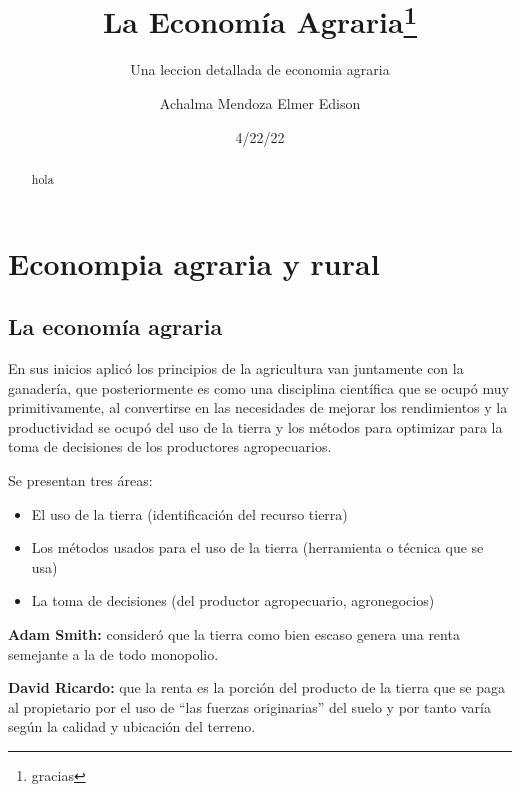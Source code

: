 \documentclass[
  a4paper,
]{article}
\title{La Economía Agraria\thanks{gracias}}
\subtitle{Una leccion detallada de economia agraria}
\author{Achalma Mendoza Elmer Edison}
\date{4/22/22}
\renewcommand*\contentsname{Table of contents}
\newcommand\contentsname{Table of contents}
\begin{document}
\maketitle
\begin{abstract}
hola
\end{abstract}
\ifdefined\Shaded\renewenvironment{Shaded}{\begin{tcolorbox}[frame hidden, enhanced, sharp corners, borderline west={3pt}{0pt}{shadecolor}, boxrule=0pt, breakable, interior hidden]}{\end{tcolorbox}}\fi

\renewcommand*\contentsname{Contenidos}
{
\hypersetup{linkcolor=}
\setcounter{tocdepth}{3}
\tableofcontents
}
\listoffigures
\listoftables
\hypertarget{econompia-agraria-y-rural}{%
\section{Econompia agraria y rural}\label{econompia-agraria-y-rural}}

\hypertarget{la-economuxeda-agraria}{%
\subsection{La economía agraria}\label{la-economuxeda-agraria}}

En sus inicios aplicó los principios de la agricultura van juntamente
con la ganadería, que posteriormente es como una disciplina científica
que se ocupó muy primitivamente, al convertirse en las necesidades de
mejorar los rendimientos y la productividad se ocupó del uso de la
tierra y los métodos para optimizar para la toma de decisiones de los
productores agropecuarios.

Se presentan tres áreas:

\begin{itemize}
\item
  El uso de la tierra (identificación del recurso tierra)
\item
  Los métodos usados para el uso de la tierra (herramienta o técnica que
  se usa)
\item
  La toma de decisiones (del productor agropecuario, agronegocios)
\end{itemize}

\textbf{Adam Smith:} consideró que la tierra como bien escaso genera una
renta semejante a la de todo monopolio.

\textbf{David Ricardo:} que la renta es la porción del producto de la
tierra que se paga al propietario por el uso de ``las fuerzas
originarias'' del suelo y por tanto varía según la calidad y ubicación
del terreno.
\end{document}

